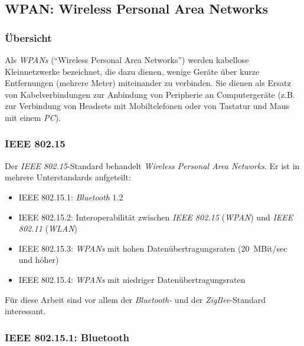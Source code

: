     \subsection{WPAN: Wireless Personal Area Networks}
        \subsubsection{Übersicht}
            Als \emph{WPANs} ("`Wireless Personal Area Networks"') werden kabellose Kleinnetzwerke bezeichnet, die dazu 
            dienen, wenige Geräte über kurze Entfernungen (mehrere Meter) miteinander zu verbinden. Sie dienen als Ersatz 
            von Kabelverbindungen zur Anbindung von Peripherie an Computergeräte (z.B. zur Verbindung von
            Headsets mit Mobiltelefonen oder von Tastatur und Maus mit einem \emph{PC}).
            

        \subsubsection{IEEE 802.15}
            Der \emph{IEEE 802.15}-Standard behandelt \textsl{Wireless Personal Area Networks}. Er ist in mehrere 
            Unterstandards aufgeteilt:

             \begin{itemize}
                \item{IEEE 802.15.1:} \emph{Bluetooth} 1.2
                \item{IEEE 802.15.2:} Interoperabilität zwischen \emph{IEEE 802.15} (\emph{WPAN}) 
                                      und \emph{IEEE 802.11} (\emph{WLAN})
                \item{IEEE 802.15.3:} \emph{WPANs} mit hohen Datenübertragungsraten (20~MBit/sec und höher)
                \item{IEEE 802.15.4:} \emph{WPANs} mit niedriger Datenübertragungsraten
            \end{itemize}

            Für diese Arbeit sind vor allem der \emph{Bluetooth-} und der \emph{ZigBee}-Standard interessant. 

        \subsubsection{IEEE 802.15.1: Bluetooth}\label{Bluetooth}
